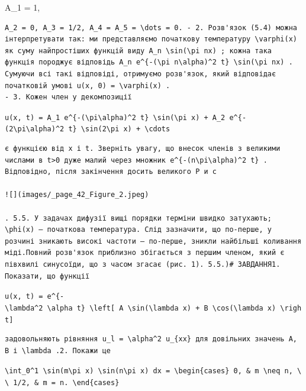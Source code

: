 \documentclass[
  ukrainian,
]{article}
\begin{document}
A\_1 = 1,

\begin{verbatim}
A_2 = 0, A_3 = 1/2, A_4 = A_5 = \dots = 0. - 2. Розв'язок (5.4) можна інтерпретувати так: ми представляємо початкову температуру \varphi(x) як суму найпростіших функцій виду A_n \sin(\pi nx) ; кожна така функція породжує відповідь A_n e^{-(\pi n\alpha)^2 t} \sin(\pi nx) . Сумуючи всі такі відповіді, отримуємо розв'язок, який відповідає початковій умові u(x, 0) = \varphi(x) .
- 3. Кожен член у декомпозиції
\end{verbatim}

\texttt{u(x,\ t)\ =\ A\_1\ e\^{}\{-(\textbackslash{}pi\textbackslash{}alpha)\^{}2\ t\}\ \textbackslash{}sin(\textbackslash{}pi\ x)\ +\ A\_2\ e\^{}\{-(2\textbackslash{}pi\textbackslash{}alpha)\^{}2\ t\}\ \textbackslash{}sin(2\textbackslash{}pi\ x)\ +\ \textbackslash{}cdots}

\begin{verbatim}
є функцією від x і t. Зверніть увагу, що внесок членів з великими числами в t>0 дуже малий через множник e^{-(n\pi\alpha)^2 t} . Відповідно, після закінчення досить великого Р и с

![](images/_page_42_Figure_2.jpeg)

. 5.5. У задачах дифузії вищі порядки терміни швидко затухають; \phi(x) — початкова температура. Слід зазначити, що по-перше, у розчині зникають високі частоти — по-перше, зникли найбільші коливання міді.Повний розв'язок приблизно збігається з першим членом, який є півхвилі синусоїди, що з часом згасає (рис. 1). 5.5.)# ЗАВДАННЯ1. Показати, що функції
\end{verbatim}

\texttt{u(x,\ t)\ =\ e\^{}\{-\textbackslash{}lambda\^{}2\ \textbackslash{}alpha\textquotesingle{}\ t\}\ \textbackslash{}left{[}\ A\ \textbackslash{}sin(\textbackslash{}lambda\ x)\ +\ B\ \textbackslash{}cos(\textbackslash{}lambda\ x)\ \textbackslash{}right{]}}

\begin{verbatim}
задовольняють рівняння u_l = \alpha^2 u_{xx} для довільних значень A, B і \lambda .2. Покажи це
\end{verbatim}

\texttt{\textbackslash{}int\_0\^{}1\ \textbackslash{}sin(m\textbackslash{}pi\ x)\ \textbackslash{}sin(n\textbackslash{}pi\ x)\ dx\ =\ \textbackslash{}begin\{cases\}\ 0,\ \&\ m\ \textbackslash{}neq\ n,\ \textbackslash{}\textbackslash{}\ 1/2,\ \&\ m\ =\ n.\ \textbackslash{}end\{cases\}}
\end{document}
